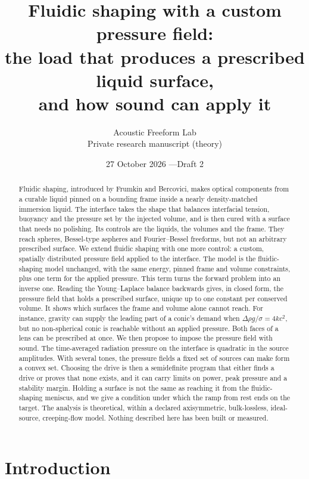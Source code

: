 \documentclass[11pt,a4paper]{article}
\title{Fluidic shaping with a custom pressure field:\\[0.4em]
\large the load that produces a prescribed liquid surface,\\
and how sound can apply it}
\author{Acoustic Freeform Lab\\\small Private research manuscript (theory)}
\date{27 October 2026 \quad---\quad Draft 2}
\numberwithin{equation}{section}
\begin{document}
\maketitle
\begin{abstract}
Fluidic shaping, introduced by Frumkin and Bercovici, makes optical components
from a curable liquid pinned on a bounding frame inside a nearly
density-matched immersion liquid. The interface takes the shape that balances
interfacial tension, buoyancy and the pressure set by the injected volume, and
is then cured with a surface that needs no polishing. Its controls are the
liquids, the volumes and the frame. They reach spheres, Bessel-type aspheres
and Fourier--Bessel freeforms, but not an arbitrary prescribed surface. We
extend fluidic shaping with one more control: a custom, spatially distributed
pressure field applied to the interface. The model is the fluidic-shaping model
unchanged, with the same energy, pinned frame and volume constraints, plus one
term for the applied pressure. This term turns the forward problem into an
inverse one. Reading the Young--Laplace balance backwards gives, in closed form,
the pressure field that holds a prescribed surface, unique up to one constant
per conserved volume. It shows which surfaces the frame and volume alone cannot
reach. For instance, gravity can supply the leading part of a conic's demand
when $\Delta\rho g/\sigma=4kc^2$, but no non-spherical conic is reachable
without an applied pressure. Both faces of a lens can be prescribed at once. We
then propose to impose the pressure field with sound. The time-averaged
radiation pressure on the interface is quadratic in the source amplitudes. With
several tones, the pressure fields a fixed set of sources can make form a
convex set. Choosing the drive is then a semidefinite program that either finds
a drive or proves that none exists, and it can carry limits on power, peak
pressure and a stability margin. Holding a surface is not the same as reaching
it from the fluidic-shaping meniscus, and we give a condition under which the
ramp from rest ends on the target. The analysis is theoretical, within a
declared axisymmetric, bulk-lossless, ideal-source, creeping-flow model.
Nothing described here has been built or measured.
\end{abstract}

{\small\tableofcontents}

\section{Introduction}\label{sec:intro}
\end{document}
